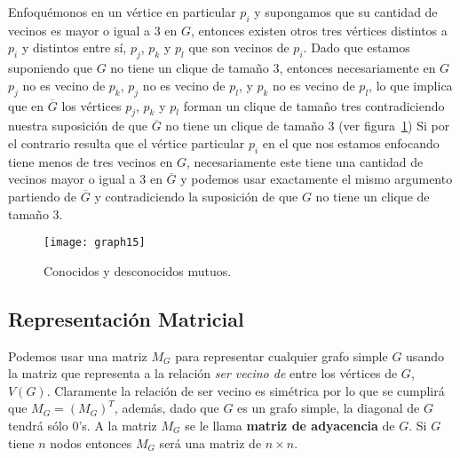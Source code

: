 \begin{ejemplo}
Enfoquémonos en un vértice en particular $p_i$ y supongamos que su cantidad de vecinos es mayor o igual a 3 en $G$, entonces existen otros tres vértices distintos a $p_i$ y distintos entre sí, $p_j$, $p_k$ y $p_l$ que son vecinos de $p_i$.
Dado que estamos suponiendo que $G$ no tiene un clique de tamaño 3, entonces necesariamente en $G$ $p_j$ no es vecino de $p_k$, $p_j$ no es vecino de $p_l$, y $p_k$ no es vecino de $p_l$, lo que implica que en $\overline G$ los vértices $p_j$, $p_k$ y $p_l$ forman un clique de tamaño tres contradiciendo nuestra suposición de que $\overline G$ no tiene un clique de tamaño 3 (ver figura~\ref{fig:graph15})
Si por el contrario resulta que el vértice particular $p_i$ en el que nos estamos enfocando tiene menos de tres vecinos en $G$, necesariamente este tiene una cantidad de vecinos mayor o igual a 3 en $\overline G$ y podemos usar exactamente el mismo argumento partiendo de $\overline G$ y contradiciendo la suposición de que $G$ no tiene un clique de tamaño 3.
\begin{figure}[h!]
\centering
\texttt{[image: graph15]}
\caption{Conocidos y desconocidos mutuos.}
\label{fig:graph15}
\end{figure}
\end{ejemplo}

\subsection{Representación Matricial}

Podemos usar una matriz $M_G$ para representar cualquier grafo simple $G$ usando la matriz que representa a la relación \emph{ser vecino de} entre los vértices de $G$, $V(G)$.
Claramente la relación de ser vecino es simétrica por lo que se cumplirá que $M_G=(M_G)^T$, además, dado que $G$ es un grafo simple, la diagonal de $G$ tendrá sólo 0's.
A la matriz $M_G$ se le llama {\bf matriz de adyacencia} de $G$.
Si $G$ tiene $n$ nodos entonces $M_G$ será una matriz de $n\times n$.

